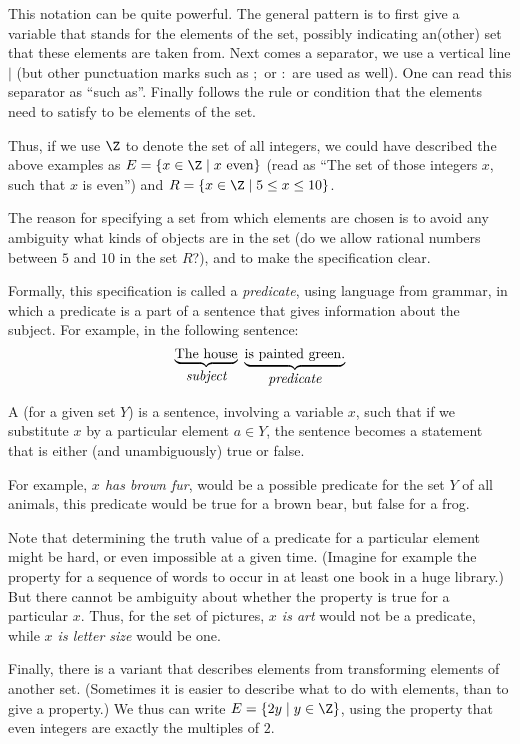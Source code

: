 This notation can be quite powerful. The general pattern is to first
give a variable that stands for the elements of the set, possibly indicating
an(other) set that these elements are taken from. Next comes a separator,
we use a vertical line $\mid$ (but other punctuation marks such as $;$ or
$:$ are used as well). One can read this separator as ``such as''.
Finally follows the rule or condition that the elements need to satisfy to
be elements of the set.

Thus, if we use $\Z$ to denote the set of all integers, we could have
described the above examples as
$E=\{x\in\Z\mid \mbox{$x$ even}\}$ (read as ``The set of those integers $x$,
such that $x$ is even'') and $R=\{x\in\Z\mid 5\le x\le 10\}$.

The reason for specifying a set from which elements are chosen is to avoid
any ambiguity what kinds of objects are in the set (do we allow rational
numbers between $5$ and $10$ in the set $R$?), and to make the specification
clear.

Formally, this specification is called a {\em predicate}, using language from
grammar, in which a predicate is a part of a sentence that gives information
about the subject. For example, in the following sentence:
\[
\underbrace{\mbox{The house}}_{\mbox{{\em subject}}}\ 
\underbrace{\mbox{is painted green.}}_{\mbox{{\em predicate}}}
\]
\begin{defn}
A  (for a given set $Y$) is a sentence, involving a
variable $x$, such that if we substitute $x$ by a particular element $a\in
Y$, the sentence becomes a statement that is either (and unambiguously)
true or false.
\end{defn}

For example, {\em $x$ has brown fur}, would be a possible predicate for the
set $Y$ of all animals, this predicate would be true for a brown bear, but
false for a frog.

Note that
determining the truth value of a predicate for a particular element
might be hard, or even impossible at a given time. (Imagine for example the
property for a sequence of words to occur in at least one book in a huge
library.)
But there cannot be ambiguity about whether the property is true for a
particular $x$. Thus, for
the set of pictures, {\em $x$ is art} would not be a predicate, while
{\em $x$ is letter size} would be one.
\smallskip

Finally, there is a variant that describes elements from transforming
elements of another set. (Sometimes
it is easier to describe what to do with elements, than to
give a property.) 
We thus can write
$E=\{2y\mid y\in\Z\}$, using the property that even integers are exactly the
multiples of $2$.
\smallskip

